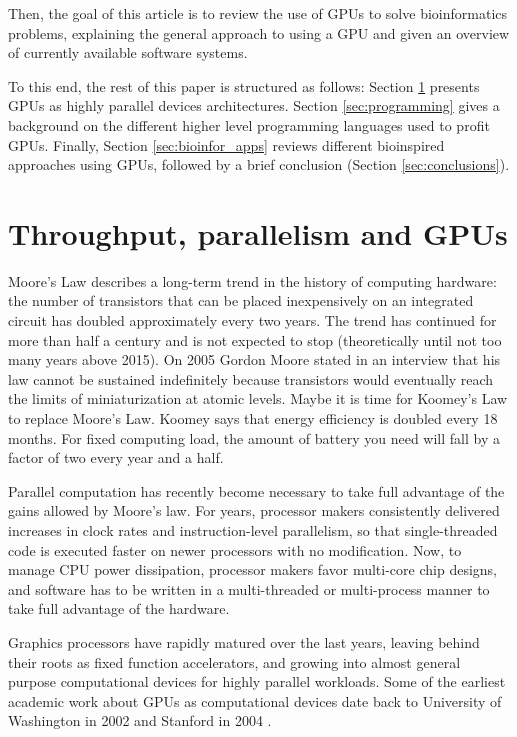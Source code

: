 \documentclass[prodmode,acmtecs]{acmsmall}
\begin{document}
Then, the goal of this article is to review the use of GPUs to solve bioinformatics problems, explaining the general approach to using a GPU and given an overview of currently available software systems.

To this end, the rest of this paper is structured as follows: Section \ref{sec:parall_and_GPUs} presents GPUs as highly parallel devices architectures.
Section \ref{sec:programming} gives a background on the different higher level programming languages used to profit GPUs. Finally, Section \ref{sec:bioinfor_apps} reviews different bioinspired approaches using GPUs, followed by a brief conclusion (Section \ref{sec:conclusions}).

\section{Throughput, parallelism and GPUs}
\label{sec:parall_and_GPUs}

Moore's Law describes a long-term trend in the history of computing hardware: the number of transistors that can be placed inexpensively on an integrated circuit has doubled approximately every two years. The trend has continued for more than half a century and is not expected to stop (theoretically until not too many years above 2015). On 2005 Gordon Moore stated in an interview that his law cannot be sustained indefinitely because transistors would eventually reach the limits of miniaturization at atomic levels. Maybe it is time for Koomey's Law \cite{10.1109/MAHC.2010.28} to replace Moore's Law. Koomey says that energy efficiency is doubled every 18 months. For fixed computing load, the amount of battery you need will fall by a factor of two every year and a half.

Parallel computation has recently become necessary to take full advantage of the gains allowed by Moore's law. For years, processor makers consistently delivered increases in clock rates and instruction-level parallelism, so that single-threaded code is executed faster on newer processors with no modification. Now, to manage CPU power dissipation, processor makers favor multi-core chip designs, and software has to be written in a multi-threaded or multi-process manner to take full advantage of the hardware.

Graphics processors have rapidly matured over the last years, leaving behind their roots as fixed function accelerators, and growing into almost general purpose computational devices for highly parallel workloads. Some of the earliest academic work about GPUs as computational devices date back to University of Washington in 2002 \cite{Thompson:2002:UMG:774861.774894} and Stanford in 2004 \cite{Buck:2004:BGS:1015706.1015800}. 
\end{document}

